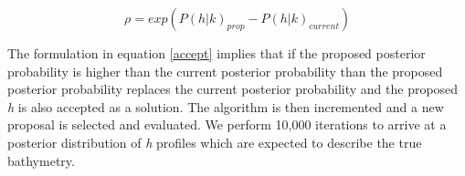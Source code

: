 \begin{equation}\label{accept}
\rho = exp(P(h|%
k)_{prop} - P(h|%
k)_{current})
\end{equation}

The formulation in equation \ref{accept} implies that if the proposed posterior probability is higher than the current posterior probability than the proposed posterior probability replaces the current posterior probability and the proposed \textit{h} is also accepted as a solution. The algorithm is then incremented and a new proposal is selected and evaluated. We perform 10,000 iterations to arrive at a posterior distribution of \textit{h} profiles which are expected to describe the true bathymetry.















